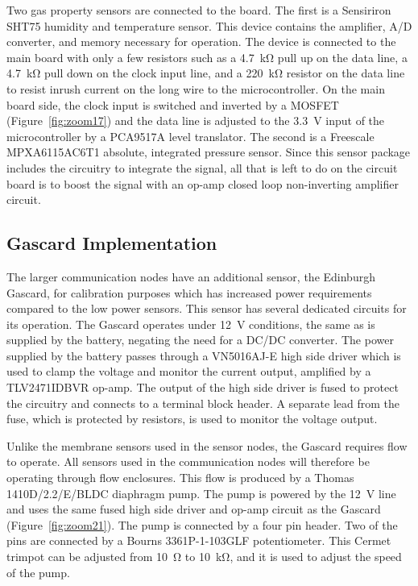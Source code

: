 \documentclass[journal]{IEEEtran}
\begin{document}
Two gas property sensors are connected to the board.  The first is a Sensiriron SHT75 humidity and temperature sensor.  This device contains the amplifier, A/D converter, and memory necessary for operation.  The device is connected to the main board with only a few resistors such as a \SI{4.7}{\kilo\ohm} pull up on the data line, a \SI{4.7}{\kilo\ohm} pull down on the clock input line, and a \SI{220}{\kilo\ohm} resistor on the data line to resist inrush current on the long wire to the microcontroller.  On the main board side, the clock input is switched and inverted by a MOSFET (Figure~\ref{fig:zoom17}) and the data line is adjusted to the \SI{3.3}{\volt} input of the microcontroller by a PCA9517A level translator.  The second is a Freescale MPXA6115AC6T1 absolute, integrated pressure sensor.  Since this sensor package includes the circuitry to integrate the signal, all that is left to do on the circuit board is to boost the signal with an op-amp closed loop non-inverting amplifier circuit.  

\subsection{Gascard Implementation}
The larger communication nodes have an additional sensor, the Edinburgh Gascard, for calibration purposes which has increased power requirements compared to the low power sensors.  This sensor has several dedicated circuits for its operation.  The Gascard operates under \SI{12}{\volt} conditions, the same as is supplied by the battery, negating the need for a DC/DC converter.  The power supplied by the battery passes through a VN5016AJ-E high side driver which is used to clamp the voltage and monitor the current output, amplified by a TLV2471IDBVR op-amp.  The output of the high side driver is fused to protect the circuitry and connects to a terminal block header.  A separate lead from the fuse, which is protected by resistors, is used to monitor the voltage output.  

Unlike the membrane sensors used in the sensor nodes, the Gascard requires flow to operate.  All sensors used in the communication nodes will therefore be operating through flow enclosures.  This flow is produced by a Thomas 1410D/2.2/E/BLDC diaphragm pump.  The pump is powered by the \SI{12}{\volt} line and uses the same fused high side driver and op-amp circuit as the Gascard (Figure~\ref{fig:zoom21}).  The pump is connected by a four pin header.  Two of the pins are connected by a Bourns 3361P-1-103GLF potentiometer.  This Cermet trimpot can be adjusted from \SI{10}{\ohm} to \SI{10}{\kilo\ohm}, and it is used to adjust the speed of the pump.  
\end{document}
